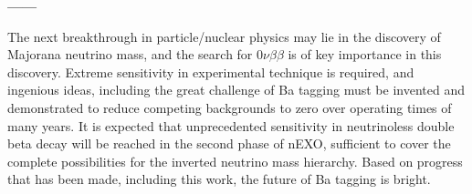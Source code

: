 \vspace{10mm}

\begin{center}
\textbf{------}
\end{center}

The next breakthrough in particle/nuclear physics may lie in the discovery of Majorana neutrino mass, and the search for $0\nu\beta\beta$ is of key importance in this discovery.  Extreme sensitivity in experimental technique is required, and ingenious ideas, including the great challenge of Ba tagging must be invented and demonstrated to reduce competing backgrounds to zero over operating times of many years.  It is expected that unprecedented sensitivity in neutrinoless double beta decay will be reached in the second phase of nEXO, sufficient to cover the complete possibilities for the inverted neutrino mass hierarchy.  Based on progress that has been made, including this work, the future of Ba tagging is bright.
